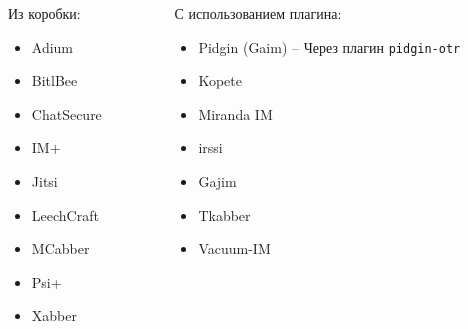 \documentclass[presentation]{beamer}
\begin{document}
\begin{frame}{}
  \begin{columns}
    \begin{column}{0.5\textwidth}
      Из коробки:
      \begin{itemize}
      \item Adium
      \item BitlBee
      \item ChatSecure
      \item IM+
      \item Jitsi
      \item LeechCraft
      \item MCabber
      \item Psi+
      \item Xabber
      \end{itemize}
    \end{column}
    \begin{column}{0.5\textwidth}
      С использованием плагина:
      \begin{itemize}
      \item Pidgin (Gaim) -- Через плагин \texttt{pidgin-otr}
      \item Kopete
      \item Miranda IM
      \item irssi
      \item Gajim
      \item Tkabber
      \item Vacuum-IM
      \end{itemize}
    \end{column}
  \end{columns}
\end{frame}
\end{document}
